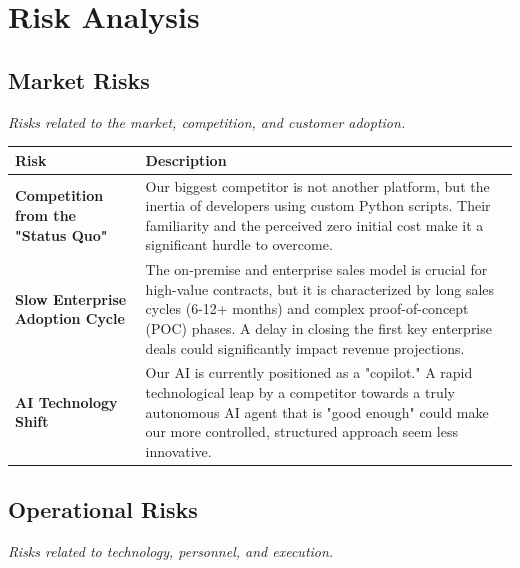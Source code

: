 \documentclass[11pt, a4paper, oneside]{article}
\begin{document}
\newpage
\section{Risk Analysis}
\subsection{Market Risks}
\textit{Risks related to the market, competition, and customer adoption.}

\begin{table}[H]
\centering
\begin{tabularx}{\textwidth}{@{}lL@{}}
\toprule
\textbf{Risk} & \textbf{Description} \\
\midrule
\textbf{Competition from the "Status Quo"} & Our biggest competitor is not another platform, but the inertia of developers using custom Python scripts. Their familiarity and the perceived zero initial cost make it a significant hurdle to overcome. \\
\addlinespace
\textbf{Slow Enterprise Adoption Cycle} & The on-premise and enterprise sales model is crucial for high-value contracts, but it is characterized by long sales cycles (6-12+ months) and complex proof-of-concept (POC) phases. A delay in closing the first key enterprise deals could significantly impact revenue projections. \\
\addlinespace
\textbf{AI Technology Shift} & Our AI is currently positioned as a "copilot." A rapid technological leap by a competitor towards a truly autonomous AI agent that is "good enough" could make our more controlled, structured approach seem less innovative. \\
\bottomrule
\end{tabularx}
\end{table}

\newpage
\subsection{Operational Risks}
\textit{Risks related to technology, personnel, and execution.}
\end{document}
